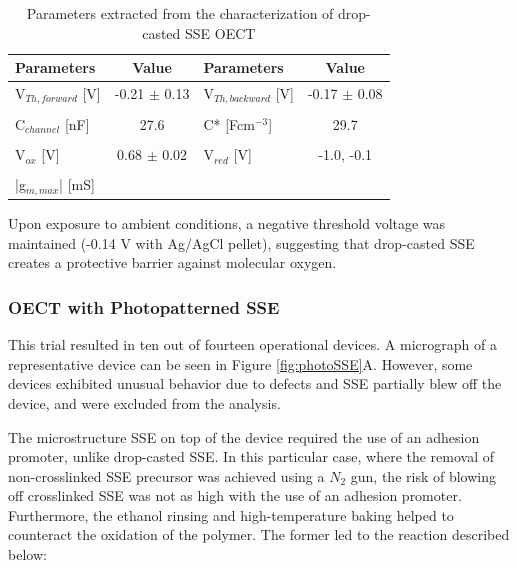 \begin{table}[ht]
\centering
\caption{Parameters extracted from the characterization of drop-casted SSE OECT}
\begin{tabular}{l|c||l|c}
Parameters & Value & Parameters & Value \\\hline \hline
V$_{Th,forward}$ [V] & -0.21 $\pm$ 0.13 & V$_{Th,backward}$ [V] & -0.17 $\pm$ 0.08\\
& & &\\[-1em]
C$_{channel}$ [nF] & 27.6 & C* [Fcm$^{-3}$] & 29.7 \\
& & &\\[-1em]
V$_{ox}$ [V] & 0.68 $\pm$ 0.02 & V$_{red}$ [V] & -1.0, -0.1 \\
& & &\\[-1em]
|g$_{m,max}$| [mS] &  &  &\\\hline
\end{tabular}
\label{tab:dropfom}
\end{table}

Upon exposure to ambient conditions, a negative threshold voltage was maintained (-0.14 V with Ag/AgCl pellet), suggesting that drop-casted SSE creates a protective barrier against molecular oxygen.%

\subsubsection{OECT with Photopatterned SSE} %
This trial resulted in ten out of fourteen operational devices. A micrograph of a representative device can be seen in Figure \ref{fig:photoSSE}A. However, some devices exhibited unusual behavior due to defects and SSE partially blew off the device, and were excluded from the analysis.

The microstructure SSE on top of the device required the use of an adhesion promoter, unlike drop-casted SSE. In this particular case, where the removal of non-crosslinked SSE precursor was achieved using a $N_{2}$ gun, the risk of blowing off crosslinked SSE was not as high with the use of an adhesion promoter. Furthermore, the ethanol rinsing and high-temperature baking helped to counteract the oxidation of the polymer. The former led to the reaction described below: \\

